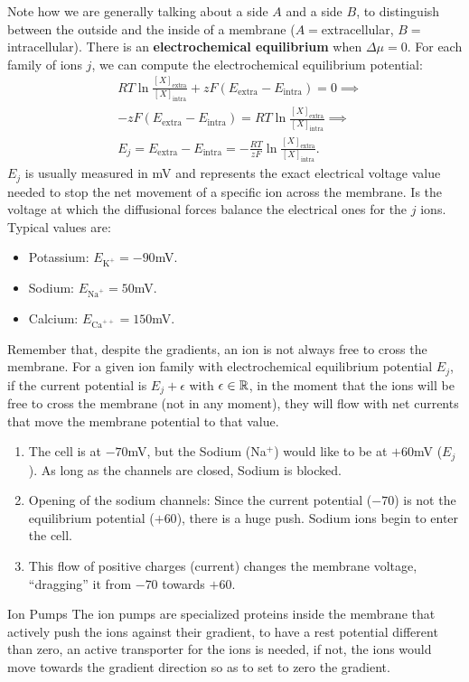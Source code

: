 \documentclass[10pt, letterpaper]{report}
\begin{document}
Note how we are generally talking about a side $A$ and a side $B$, to distinguish between the outside and the inside of a membrane ($A=$extracellular, $B=$intracellular). There is an \textbf{electrochemical equilibrium} when $\Delta\mu=0$. For each family of ions $j$, we can compute the electrochemical equilibrium potential:\begin{align}
     &RT\ln\frac{[X]_{\text{extra}}}{[X]_{\text{intra}}}+zF(E_{\text{extra}}-E_{\text{intra}})=0\implies\\
     &-zF(E_{\text{extra}}-E_{\text{intra}})=RT\ln\frac{[X]_{\text{extra}}}{[X]_{\text{intra}}}\implies\\
     &E_j=E_{\text{extra}}-E_{\text{intra}}=-\frac{RT}{zF}\ln\frac{[X]_{\text{extra}}}{[X]_{\text{intra}}}.
\end{align}
$E_j$ is usually measured in mV and represents the exact electrical voltage value needed to stop the net movement of a specific ion across the membrane. Is the voltage at which the diffusional forces balance the electrical ones for the $j$ ions. Typical values are:\begin{itemize}
     \item Potassium: $E_{\text{K}^+}=-90$mV.
     \item Sodium: $E_{\text{Na}^+}=50$mV.
     \item Calcium: $E_{\text{Ca}^{++}}=150$mV.
\end{itemize}
Remember that, despite the gradients, an ion is not always free to cross the membrane. For a given ion family with electrochemical equilibrium potential $E_j$, if the current potential is $E_j+\epsilon$ with $\epsilon\in {\mathbb R}$, in the moment that the ions will be free to cross the
membrane (not in any moment), they will flow with net currents that move the membrane
potential to that value.\begin{enumerate}
     \item The cell is at $-70 $mV, but the Sodium (Na$^+$) would like to be at $+60 $mV ($E_j$). As long as the channels are closed, Sodium is blocked.
     \item Opening of the sodium channels: Since the current potential ($-70$) is not the equilibrium potential ($+60$), there is a huge push. Sodium ions begin to enter the cell.
     \item This flow of positive charges (current) changes the membrane voltage, ``dragging'' it from $-70$ towards $+60$.
\end{enumerate}
\begin{boxdefinition}{Ion Pumps}{}
     The ion pumps are specialized proteins inside the membrane that actively push the ions against their gradient, to have a rest potential different than zero, an active transporter for the ions is needed, if not, the ions would move towards the gradient direction so as to set to zero the gradient.
\end{boxdefinition}
\end{document}
